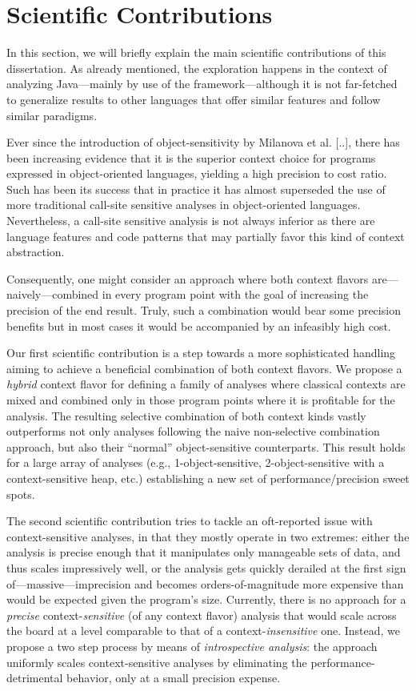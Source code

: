 \section{Scientific Contributions}

In this section, we will briefly explain the main scientific contributions of
this dissertation. As already mentioned, the exploration happens in the context
of analyzing Java---mainly by use of the \doop{} framework---although it is not
far-fetched to generalize results to other languages that offer similar
features and follow similar paradigms.

Ever since the introduction of object-sensitivity by Milanova et al. [..],
there has been increasing evidence that it is the superior context choice for
programs expressed in object-oriented languages, yielding a high precision to
cost ratio. Such has been its success that in practice it has almost superseded
the use of more traditional call-site sensitive analyses in object-oriented
languages. Nevertheless, a call-site sensitive analysis is not always inferior
as there are language features and code patterns that may partially favor this
kind of context abstraction.

Consequently, one might consider an approach where both context flavors
are---naively---combined in every program point with the goal of increasing the
precision of the end result. Truly, such a combination would bear some
precision benefits but in most cases it would be accompanied by an infeasibly
high cost.

 Our first scientific contribution is a step towards a more sophisticated
handling aiming to achieve a beneficial combination of both context flavors. We
propose a \emph{hybrid} context flavor for defining a family of analyses where
classical contexts are mixed and combined only in those program points where it
is profitable for the analysis. The resulting selective combination of both
context kinds vastly outperforms not only analyses following the naive
non-selective combination approach, but also their ``normal'' object-sensitive
counterparts. This result holds for a large array of analyses (e.g.,
1-object-sensitive, 2-object-sensitive with a context-sensitive heap, etc.)
establishing a new set of performance/precision sweet spots.

 The second scientific contribution tries to tackle an oft-reported issue with
context-sensitive analyses, in that they mostly operate in two extremes: either
the analysis is precise enough that it manipulates only manageable sets of
data, and thus scales impressively well, or the analysis gets quickly derailed
at the first sign of---massive---imprecision and becomes orders-of-magnitude
more expensive than would be expected given the program's size. Currently,
there is no approach for a \emph{precise} context-\emph{sensitive} (of any
context flavor) analysis that would scale across the board at a level
comparable to that of a context-\emph{insensitive} one. Instead, we propose a
two step process by means of \emph{introspective analysis}: the approach
uniformly scales context-sensitive analyses by eliminating the
performance-detrimental behavior, only at a small precision expense.

